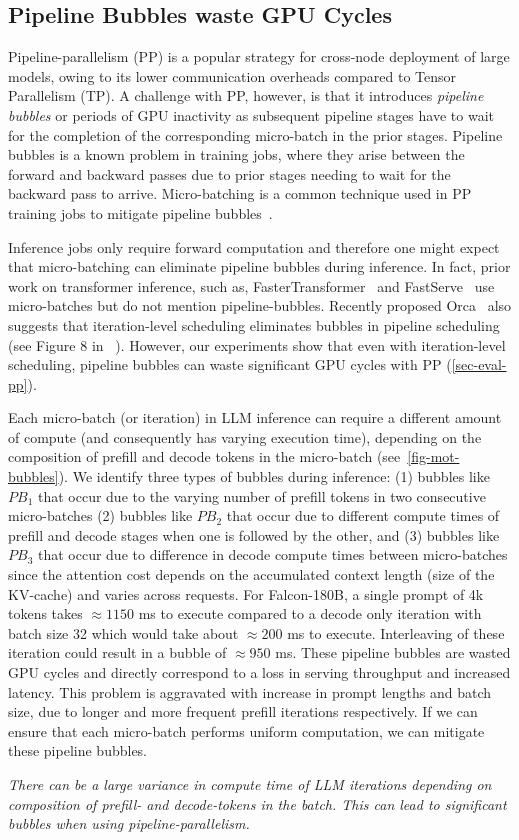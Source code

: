 
\subsection{Pipeline Bubbles waste GPU Cycles}
Pipeline-parallelism (PP) is a popular strategy for cross-node deployment of large models, owing to its lower communication overheads compared to Tensor Parallelism (TP). A challenge with PP, however, is that it introduces \textit{pipeline bubbles} or periods of GPU inactivity as subsequent pipeline stages have to wait for the completion of the corresponding micro-batch in the prior stages. Pipeline bubbles is a known problem in training jobs, where they arise between the forward and backward passes due to prior stages needing to wait for the backward pass to arrive. Micro-batching is a common technique used in PP training jobs to mitigate pipeline bubbles~\cite{varuna,pipedream,gpipe}. 

Inference jobs only require forward computation and therefore one might expect that micro-batching can eliminate pipeline bubbles during inference. In fact, prior work on transformer inference, such as, FasterTransformer~\cite{fastertransformer} and FastServe~\cite{fastserve} use micro-batches but do not mention pipeline-bubbles.  Recently proposed Orca~\cite{orca} also suggests that iteration-level scheduling eliminates bubbles in pipeline scheduling (see Figure 8 in ~\cite{orca}). However, our experiments show that even with iteration-level scheduling, pipeline bubbles can waste significant GPU cycles with PP (\autoref{sec-eval-pp}).



Each micro-batch (or iteration) in LLM inference can require a different amount of compute (and consequently has varying execution time), depending on the composition of prefill and decode tokens in the micro-batch (see~\autoref{fig-mot-bubbles}). We identify three types of bubbles during inference: (1) bubbles like $PB_1$ that occur due to the varying number of prefill tokens in two consecutive micro-batches (2) bubbles like $PB_2$ that occur due to different compute times of prefill and decode stages when one is followed by the other, and (3) bubbles like $PB_3$ that occur due to difference in decode compute times between micro-batches since the attention cost depends on the accumulated context length  (size of the KV-cache) and varies across requests. For Falcon-180B, a single prompt of 4k tokens takes $\approx1150$ ms to execute compared to a decode only iteration with batch size 32 which would take about $\approx200$ ms to execute. Interleaving of these iteration could result in a bubble of $\approx950$ ms. These pipeline bubbles are wasted GPU cycles and directly correspond to a loss in serving throughput and increased latency. This problem is aggravated with increase in prompt lengths and batch size, due to longer and more frequent prefill iterations respectively. If we can ensure that each micro-batch performs uniform computation, we can mitigate these pipeline bubbles.

 \textit{There can be a large variance in compute time of LLM iterations depending on composition of prefill- and decode-tokens in the batch. This can lead to significant bubbles when using pipeline-parallelism.}

